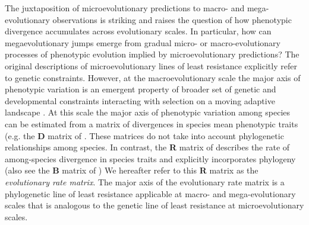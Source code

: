 \documentclass[12pt,letterpaper]{article}
\begin{document}
The juxtaposition of microevolutionary predictions to macro- and mega-evolutionary observations is striking and raises the question of how phenotypic divergence accumulates across evolutionary scales.
In particular, how can megaevolutionary jumps emerge from gradual micro- or macro-evolutionary processes of phenotypic evolution implied by microevolutionary predictions? \cite{hansen2016,jablonski2022evolvability}
The original descriptions of microevolutionary lines of least resistance explicitly refer to genetic constraints.
However, at the macroevolutionary scale the major axis of phenotypic variation is an emergent property of broader set of genetic and developmental constraints interacting with selection on a moving adaptive landscape %
\cite{BurinWhales,jones2004evolution}. %
At this scale the major axis of phenotypic variation among species \cite{marroig2005size, fasanelli2022allometry} can be estimated from a matrix of divergences in species mean phenotypic traits (e.g. the \textbf{D} matrix of \cite{BlowsHiggie2003, mcglothlin2018adaptive}.
These matrices do not take into account phylogenetic relationships among species.
In contrast, the \textbf{R} matrix of \cite{Houle2017} describes the rate of among-species divergence in species traits and explicitly incorporates phylogeny (also see the \textbf{B} matrix of \cite{Machado2020}) %
We hereafter refer to this \textbf{R} matrix as the \textit{evolutionary rate matrix}. %
The major axis of the evolutionary rate matrix is a phylogenetic line of least resistance applicable at macro- and mega-evolutionary scales that is analogous to the genetic line of least resistance at microevolutionary scales. %
\end{document}
